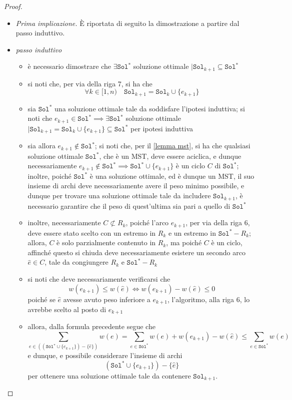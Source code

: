 \documentclass[14pt]{extreport}
\theoremstyle{definition}
\theoremstyle{definition}
\begin{document}
\begin{proof}
    \begin{itemize}
        \item[] \textit{Prima implicazione.} È riportata di seguito la dimostrazione a partire dal passo induttivo. 
        \item \textit{passo induttivo}
            \begin{itemize}
                \item è necessario dimostrare che $\exists \texttt{Sol}^*$ soluzione ottimale $\mid \texttt{Sol}_{k + 1} \subseteq \texttt{Sol}^*$
                \item si noti che, per via della riga 7, si ha che $$\forall k \in [1, n) \quad \texttt{Sol}_{k +1} = \texttt{Sol}_k \cup \{e_{k +1}\}$$
                \item sia $\texttt{Sol}^*$ una soluzione ottimale tale da soddisfare l'ipotesi induttiva; si noti che $e_{k +1} \in \texttt{Sol}^* \implies \exists \texttt{Sol}^*$ soluzione ottimale $\mid \texttt{Sol}_{k +1} = \texttt{Sol}_k \cup \{e_{k +1}\} \subseteq \texttt{Sol}^*$ per ipotesi induttiva
                \item sia allora $e_{k +1} \notin \texttt{Sol}^*$; si noti che, per il \cref{lemma mst}, si ha che qualsiasi soluzione ottimale $\texttt{Sol}^*$, che è un MST, deve essere aciclica, e dunque necessariamente $e_{k +1} \notin \texttt{Sol}^* \implies \texttt{Sol}^* \cup \{e_{k +1}\}$ è un ciclo $C$ di $\texttt{Sol}^*$; inoltre, poiché $\texttt{Sol}^*$ è una soluzione ottimale, ed è dunque un MST, il suo insieme di archi deve necessariamente avere il peso minimo possibile, e dunque per trovare una soluzione ottimale tale da includere $\texttt{Sol}_{k + 1}$, è necessario garantire che il peso di quest'ultima sia pari a quello di $\texttt{Sol}^*$
                \item inoltre, necessariamente $C \not \subset R_k$, poiché l'arco $e_{k + 1}$, per via della riga 6, deve essere stato scelto con un estremo in $R_k$ e un estremo in $\texttt{Sol}^* - R_k$; allora, $C$ è solo parzialmente contenuto in $R_k$, ma poiché $C$ è un ciclo, affinché questo si chiuda deve necessariamente esistere un secondo arco $\hat e \in C$, tale da congiungere $R_k$ e $\texttt{Sol}^* - R_k$
                \item si noti che deve necessariamente verificarsi che $$w(e_{k +1}) \le w(\hat e) \iff w(e_{k +1}) - w(\hat e) \le 0$$ poiché se $\hat e$ avesse avuto peso inferiore a $e_{k +1}$, l'algoritmo, alla riga 6, lo avrebbe scelto al posto di $e_{k +1}$
                \item allora, dalla formula precedente segue che $$\displaystyle \sum_{e \in ((\texttt{Sol}^* \cup \{e_{k +1}\} )- \{\hat e\} )}{w(e)}  = \sum_{e \in \texttt{Sol}^*}{w(e)} + w(e_{k +1}) - w(\hat e) \le \sum_{e \in \texttt{Sol}^*}{w(e)}$$ e dunque, e possibile considerare l'insieme di archi $$(\texttt{Sol}^* \cup \{e_{k+1}\}) - \{\hat e\}$$ per ottenere una soluzione ottimale tale da contenere $\texttt{Sol}_{k + 1}$.
            \end{itemize}


\end{itemize}
\end{proof}
\end{document}
